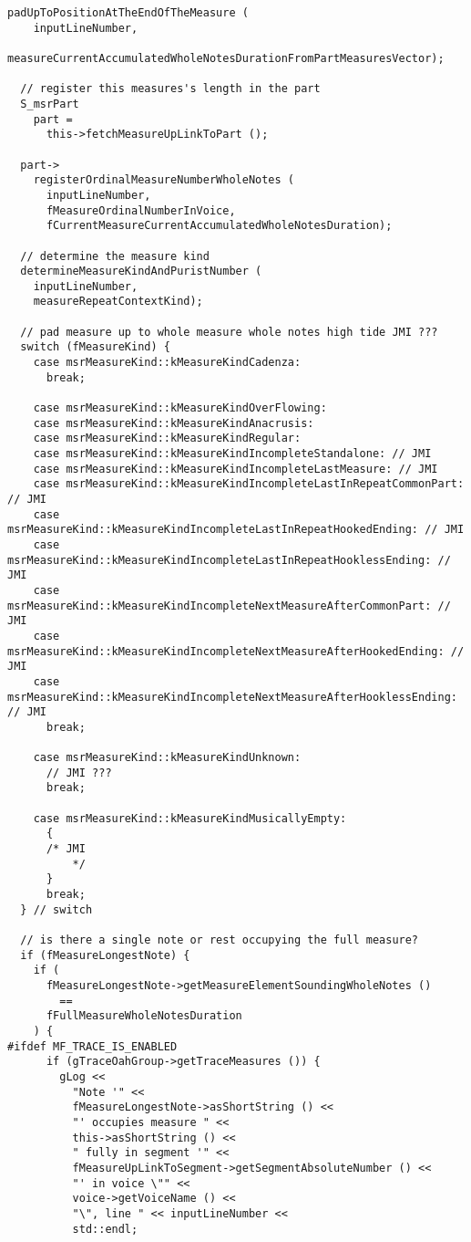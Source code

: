 \begin{lstlisting}[language=CPlusPlus]
  padUpToPositionAtTheEndOfTheMeasure (
    inputLineNumber,
    measureCurrentAccumulatedWholeNotesDurationFromPartMeasuresVector);

  // register this measures's length in the part
  S_msrPart
    part =
      this->fetchMeasureUpLinkToPart ();

  part->
    registerOrdinalMeasureNumberWholeNotes (
      inputLineNumber,
      fMeasureOrdinalNumberInVoice,
      fCurrentMeasureCurrentAccumulatedWholeNotesDuration);

  // determine the measure kind
  determineMeasureKindAndPuristNumber (
    inputLineNumber,
    measureRepeatContextKind);

  // pad measure up to whole measure whole notes high tide JMI ???
  switch (fMeasureKind) {
    case msrMeasureKind::kMeasureKindCadenza:
      break;

    case msrMeasureKind::kMeasureKindOverFlowing:
    case msrMeasureKind::kMeasureKindAnacrusis:
    case msrMeasureKind::kMeasureKindRegular:
    case msrMeasureKind::kMeasureKindIncompleteStandalone: // JMI
    case msrMeasureKind::kMeasureKindIncompleteLastMeasure: // JMI
    case msrMeasureKind::kMeasureKindIncompleteLastInRepeatCommonPart: // JMI
    case msrMeasureKind::kMeasureKindIncompleteLastInRepeatHookedEnding: // JMI
    case msrMeasureKind::kMeasureKindIncompleteLastInRepeatHooklessEnding: // JMI
    case msrMeasureKind::kMeasureKindIncompleteNextMeasureAfterCommonPart: // JMI
    case msrMeasureKind::kMeasureKindIncompleteNextMeasureAfterHookedEnding: // JMI
    case msrMeasureKind::kMeasureKindIncompleteNextMeasureAfterHooklessEnding: // JMI
      break;

    case msrMeasureKind::kMeasureKindUnknown:
      // JMI ???
      break;

    case msrMeasureKind::kMeasureKindMusicallyEmpty:
      {
      /* JMI
          */
      }
      break;
  } // switch

  // is there a single note or rest occupying the full measure?
  if (fMeasureLongestNote) {
    if (
      fMeasureLongestNote->getMeasureElementSoundingWholeNotes ()
        ==
      fFullMeasureWholeNotesDuration
    ) {
#ifdef MF_TRACE_IS_ENABLED
      if (gTraceOahGroup->getTraceMeasures ()) {
        gLog <<
          "Note '" <<
          fMeasureLongestNote->asShortString () <<
          "' occupies measure " <<
          this->asShortString () <<
          " fully in segment '" <<
          fMeasureUpLinkToSegment->getSegmentAbsoluteNumber () <<
          "' in voice \"" <<
          voice->getVoiceName () <<
          "\", line " << inputLineNumber <<
          std::endl;


\end{lstlisting}
